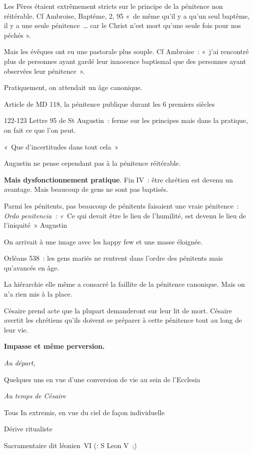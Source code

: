 Les Pères étaient extrêmement stricts sur le principe de la pénitence
non réitérable. Cf Ambroise, Baptême, 2, 95 «~de même qu'il y a qu'un
seul baptême, il y a une seule pénitence~\ldots{} car le Christ n'est
mort qu'une seule fois pour nos péchés ».

Mais les évêques ont eu une pastorale plus souple. Cf Ambroise~: «~j'ai
rencontré plus de personnes ayant gardé leur innocence baptismal que des
personnes ayant observées leur pénitence~».

Pratiquement, on attendait un âge canonique.

Article de MD 118, la pénitence publique durant les 6 premiers siècles

122-123 Lettre 95 de St Augustin~: ferme sur les principes mais dans la
pratique, on fait ce que l'on peut.

«~Que d'incertitudes dans tout cela~»

Augustin ne pense cependant pas à la pénitence réitérable.

\textbf{Mais dysfonctionnement pratique}. Fin IV~: être chrétien est
devenu un avantage. Mais beaucoup de gens ne sont pas baptisés.

Parmi les pénitents, pas beaucoup de pénitents faisaient une vraie
pénitence~: \emph{Ordo penitencia~: «~}Ce qui devait être le lieu de
l'humilité, est devenu le lieu de l'iniquité~» Augustin

On arrivait à une image avec les happy few et une masse éloignée.

Orléans 538~: les gens mariés ne rentrent dans l'ordre des pénitents
mais qu'avancés en âge.

La hiérarchie elle même a consacré la faillite de la pénitence
canonique. Mais on n'a rien mis à la place.

Césaire prend acte que la plupart demanderont sur leur lit de mort.
Césaire avertit les chrétiens qu'ils doivent se préparer à cette
pénitence tout au long de leur vie.

\textbf{Impasse et même perversion.}

\emph{Au départ,}

Quelques uns en vue d'une conversion de vie au sein de l'Ecclesia

\emph{Au temps de Césaire}

Tous In extremis, en vue du ciel de façon individuelle

Dérive ritualiste

Sacramentaire dit léonien~VI (: S Leon V~;)

